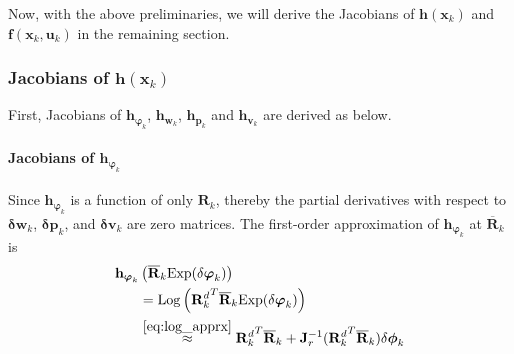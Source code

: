 Now, with the above preliminaries, we will derive the Jacobians of $\mathbf{h}(\mathbf{x}_{k})$ and $\mathbf{f}(\mathbf{x}_k,\mathbf{u}_k)$ in the remaining section.\\

\subsubsection{Jacobians of $\mathbf{h}(\mathbf{x}_{k})$}
First, Jacobians of $\mathbf{h}_{\boldsymbol{\varphi}_{k}}$, $\mathbf{h}_{\mathbf{w}_{k}}$, $\mathbf{h}_{\mathbf{p}_{k}}$ and $\mathbf{h}_{\mathbf{v}_{k}}$ are derived as below.\\

\paragraph{Jacobians of $\mathbf{h}_{\boldsymbol{\varphi}_{k}}$}
Since $\mathbf{h}_{\boldsymbol{\varphi}_{k}}$ is a function of only $\mathbf{R}_k$, thereby the partial derivatives with respect to $\mathbf{\delta w}_k$, $\mathbf{\delta p}_k$, and $\mathbf{\delta v}_k$ are zero matrices. The first-order approximation of $\mathbf{h}_{\boldsymbol{\varphi}_{k}}$ at $\overline{\mathbf{R}}_{k}$ is
\begin{align}
\label{eq:h_phi_phi}
\mathbf{h}_{\boldsymbol{\varphi}_{k}}&\left(\overline{\mathbf{R}}_{k}\mathrm{Exp}(\delta{\boldsymbol{\varphi}_{k}})\right) \nonumber \\
&= \mathrm{Log}\left({\mathbf{R}_k^d}^T \overline{\mathbf{R}}_{k} \mathrm{Exp}(\delta{\boldsymbol{\varphi}_{k}})\right)\nonumber \\
&\overset{\eqref{eq:log_apprx}}{\approx} {\mathbf{R}_k^d}^T \overline{\mathbf{R}}_{k} + \mathbf{J}_{r}^{-1}({\mathbf{R}_k^d}^T \overline{\mathbf{R}}_{k})\delta{\boldsymbol{\phi}_k}
\end{align}

